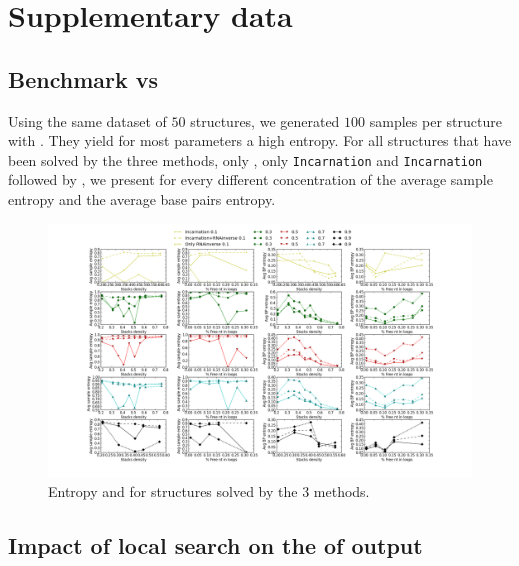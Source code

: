 \section{Supplementary data}
\subsection{Benchmark \ourprog vs \RNAinverse}
Using the same dataset of $50$ structures, we generated $100$ samples
per structure with \RNAinverse. They yield for most parameters
a high entropy. For all structures that have been solved 
by the three methods, only \RNAinverse, only \texttt{Incarnation} and
\texttt{Incarnation} followed by \RNAinverse,
we present for every different concentration of \GCContent
the average sample entropy and the average base pairs entropy.


\begin{figure}[ht!]
	\hspace{-5em}
	\includegraphics[scale=0.4]{Figures/RNAinverse_data_100.png}
	\caption{Entropy and \GCContent  for structures solved by
	the 3 methods.}
	\label{fig:rnainverse}
\end{figure}

%
\subsection{Impact of local search on the \GCContent of \ourprog output}

